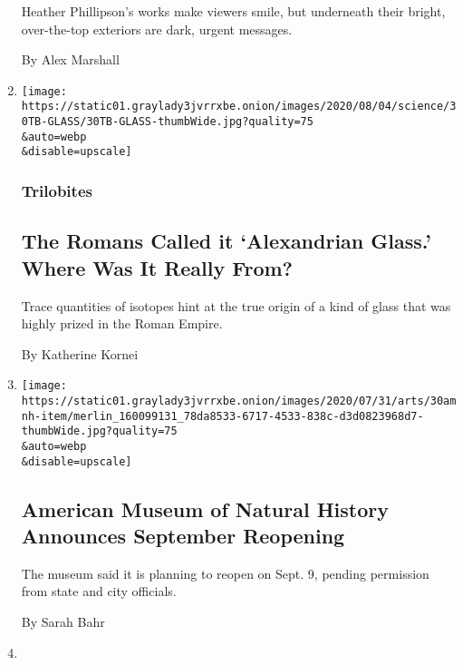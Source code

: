 \begin{enumerate}
  Heather Phillipson's works make viewers smile, but underneath their
  bright, over-the-top exteriors are dark, urgent messages.

  By Alex Marshall
\item
  \href{/2020/07/31/science/alexandrian-glass-rome.html}{}

  \texttt{[image: https://static01.graylady3jvrrxbe.onion/images/2020/08/04/science/30TB-GLASS/30TB-GLASS-thumbWide.jpg?quality=75\\\&auto=webp\\\&disable=upscale]}

  \hypertarget{trilobites}{%
  \subsubsection{Trilobites}\label{trilobites}}

  \hypertarget{the-romans-called-it-alexandrian-glass-where-was-it-really-from}{%
  \subsection{The Romans Called it `Alexandrian Glass.' Where Was It
  Really
  From?}\label{the-romans-called-it-alexandrian-glass-where-was-it-really-from}}

  Trace quantities of isotopes hint at the true origin of a kind of
  glass that was highly prized in the Roman Empire.

  By Katherine Kornei
\item
  \href{/2020/07/30/arts/design/american-museum-of-natural-history-reopen-covid.html}{}

  \texttt{[image: https://static01.graylady3jvrrxbe.onion/images/2020/07/31/arts/30amnh-item/merlin\_160099131\_78da8533-6717-4533-838c-d3d0823968d7-thumbWide.jpg?quality=75\\\&auto=webp\\\&disable=upscale]}

  \hypertarget{american-museum-of-natural-history-announces-september-reopening}{%
  \subsection{American Museum of Natural History Announces September
  Reopening}\label{american-museum-of-natural-history-announces-september-reopening}}

  The museum said it is planning to reopen on Sept. 9, pending
  permission from state and city officials.

  By Sarah Bahr
\item
  \href{/2020/07/30/arts/things-to-do-weekend-coronavirus.html}{}


\end{enumerate}
